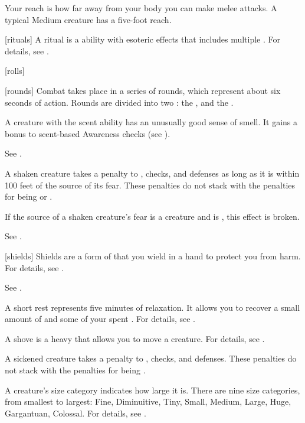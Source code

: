  Your reach is how far away from your body you can make melee attacks.
A typical Medium creature has a five-foot reach.

[rituals] A ritual is a  ability with esoteric effects that includes multiple .
For details, see .

[rolls] 

[rounds] Combat takes place in a series of rounds, which represent about six seconds of action.
Rounds are divided into two : the , and the .

 A creature with the scent ability has an unusually good sense of smell.
It gains a  bonus to scent-based Awareness checks (see ).

 See .

 A shaken creature takes a  penalty to , checks, and defenses as long as it is within 100 feet of the source of its fear.
These penalties do not stack with the penalties for being \frightened or \panicked.

If the source of a shaken creature's fear is a creature and is , this effect is broken.

 See .

[shields] Shields are a form of  that you wield in a hand to protect you from harm.
For details, see .

 See .

 A short rest represents five minutes of relaxation.
It allows you to recover a small amount of  and some of your spent .
For details, see .

 A shove is a heavy  that allows you to move a creature.
For details, see .

 A sickened creature takes a  penalty to , checks, and defenses.
These penalties do not stack with the penalties for being \nauseated.

 A creature's size category indicates how large it is.
There are nine size categories, from smallest to largest: Fine, Diminuitive, Tiny, Small, Medium, Large, Huge, Gargantuan, Colossal.
For details, see .

